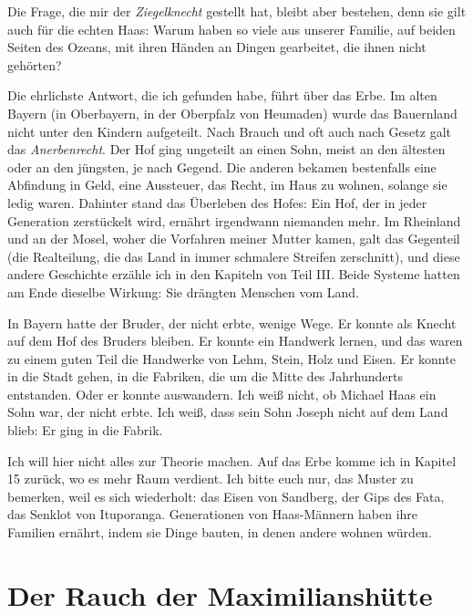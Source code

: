 \documentclass[
  ngerman,
  11pt,
  openany]{book}
\begin{document}
Die Frage, die mir der \emph{Ziegelknecht} gestellt hat, bleibt aber
bestehen, denn sie gilt auch für die echten Haas: Warum haben so viele
aus unserer Familie, auf beiden Seiten des Ozeans, mit ihren Händen an
Dingen gearbeitet, die ihnen nicht gehörten?

Die ehrlichste Antwort, die ich gefunden habe, führt über das Erbe. Im
alten Bayern (in Oberbayern, in der Oberpfalz von Heumaden) wurde das
Bauernland nicht unter den Kindern aufgeteilt. Nach Brauch und oft auch
nach Gesetz galt das \emph{Anerbenrecht}. Der Hof ging ungeteilt an
einen Sohn, meist an den ältesten oder an den jüngsten, je nach Gegend.
Die anderen bekamen bestenfalls eine Abfindung in Geld, eine Aussteuer,
das Recht, im Haus zu wohnen, solange sie ledig waren. Dahinter stand
das Überleben des Hofes: Ein Hof, der in jeder Generation zerstückelt
wird, ernährt irgendwann niemanden mehr. Im Rheinland und an der Mosel,
woher die Vorfahren meiner Mutter kamen, galt das Gegenteil (die
Realteilung, die das Land in immer schmalere Streifen zerschnitt), und
diese andere Geschichte erzähle ich in den Kapiteln von Teil III. Beide
Systeme hatten am Ende dieselbe Wirkung: Sie drängten Menschen vom Land.

In Bayern hatte der Bruder, der nicht erbte, wenige Wege. Er konnte als
Knecht auf dem Hof des Bruders bleiben. Er konnte ein Handwerk lernen,
und das waren zu einem guten Teil die Handwerke von Lehm, Stein, Holz
und Eisen. Er konnte in die Stadt gehen, in die Fabriken, die um die
Mitte des Jahrhunderts entstanden. Oder er konnte auswandern. Ich weiß
nicht, ob Michael Haas ein Sohn war, der nicht erbte. Ich weiß, dass
sein Sohn Joseph nicht auf dem Land blieb: Er ging in die Fabrik.

Ich will hier nicht alles zur Theorie machen. Auf das Erbe komme ich in
Kapitel 15 zurück, wo es mehr Raum verdient. Ich bitte euch nur, das
Muster zu bemerken, weil es sich wiederholt: das Eisen von Sandberg, der
Gips des Fata, das Senklot von Ituporanga. Generationen von Haas-Männern
haben ihre Familien ernährt, indem sie Dinge bauten, in denen andere
wohnen würden.

\section{Der Rauch der
Maximilianshütte}\label{der-rauch-der-maximilianshuxfctte}
\end{document}
